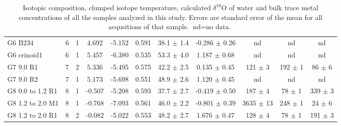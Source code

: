 \documentclass{article}
\newcommand{\deltao}{$\delta^{18}$}
\begin{document}
\begin{sidewaystable}[htbp]
\begin{tabular}{ | l | c | c | c | c | c | c | c | c | c | c | }
G6 B234 & 6 & 1 & 4.692 & -5.152 & 0.591 & 38.1 $\pm$ 1.4 & -0.286 $\pm$ 0.26 &  nd  &  nd  &  nd  \\
G6 crinoid1 & 6 & 1 & 5.457 & -6.380 & 0.535 & 53.3 $\pm$ 4.0 & 1.187 $\pm$ 0.68 &  nd  &  nd  &  nd  \\
G7 9.0 R1 & 7 & 2 & 5.336 & -5.495 & 0.575 & 42.2 $\pm$ 2.5 & 0.135 $\pm$ 0.45 & 121 $\pm$ 3 & 192 $\pm$ 1 & 86 $\pm$ 6 \\
G7 9.0 R2 & 7 & 1 & 5.173 & -5.698 & 0.551 & 48.9 $\pm$ 2.6 & 1.120 $\pm$ 0.45 &  nd  &  nd  &  nd  \\
G8 0.0 to 1.2 R1 & 8 & 1 & -0.507 & -5.208 & 0.593 & 37.7 $\pm$ 2.7 & -0.419 $\pm$ 0.50 & 187 $\pm$ 4 & 78 $\pm$ 1 & 339 $\pm$ 3 \\
G8 1.2 to 2.0 M1 & 8 & 1 & -0.768 & -7.093 & 0.561 & 46.0 $\pm$ 2.2 & -0.801 $\pm$ 0.39 & 3635 $\pm$ 13 & 248 $\pm$ 1 & 24 $\pm$ 6 \\
G8 1.2 to 2.0 R1 & 8 & 2 & -0.082 & -5.022 & 0.553 & 48.2 $\pm$ 2.7 & 1.676 $\pm$ 0.47 & 128 $\pm$ 4 & 78 $\pm$ 1 & 191 $\pm$ 3 \\
\end{tabular} 
\caption{Isotopic composition, clumped isotope temperature, calculated \deltao O of water and bulk trace metal concentrations of all the samples analyzed in this study. Errors are standard error of the mean for all acqusitions of that sample. $\text{nd}=\text{no data.}$}
\label{results}
\end{sidewaystable}
\end{document}
